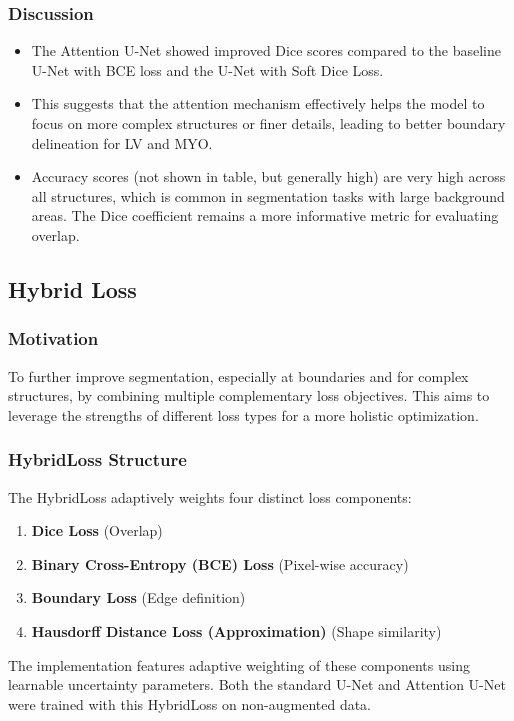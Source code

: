 \documentclass{article}
\begin{document}
\subsubsection{Discussion}
\begin{itemize}
  \item The Attention U-Net showed improved Dice scores compared to the baseline U-Net with BCE loss and the U-Net with Soft Dice Loss.
  \item This suggests that the attention mechanism effectively helps the model to focus on more complex structures or finer details, leading to better boundary delineation for LV and MYO.
  \item Accuracy scores (not shown in table, but generally high) are very high across all structures, which is common in segmentation tasks with large background areas. The Dice coefficient remains a more informative metric for evaluating overlap.
\end{itemize}

\subsection{Hybrid Loss}
\subsubsection{Motivation}
To further improve segmentation, especially at boundaries and for complex structures, by combining multiple complementary loss objectives. This aims to leverage the strengths of different loss types for a more holistic optimization.

\subsubsection{HybridLoss Structure}
The HybridLoss adaptively weights four distinct loss components:
\begin{enumerate}
  \item \textbf{Dice Loss} (Overlap)
  \item \textbf{Binary Cross-Entropy (BCE) Loss} (Pixel-wise accuracy)
  \item \textbf{Boundary Loss} (Edge definition)
  \item \textbf{Hausdorff Distance Loss (Approximation)} (Shape similarity)
\end{enumerate}

The implementation features adaptive weighting of these components using learnable uncertainty parameters. Both the standard U-Net and Attention U-Net were trained with this HybridLoss on non-augmented data.
\end{document}
